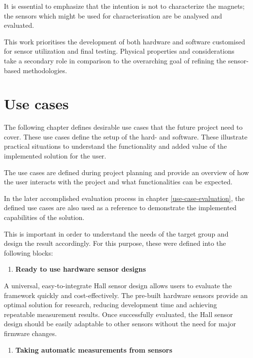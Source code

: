 It is essential to emphasize that the intention is not to characterize
the magnets; the sensors which might be used for characterisation are be
analysed and evaluated.

This work prioritises the development of both hardware and software
customised for sensor utilization and final testing. Physical properties
and considerations take a secondary role in comparison to the
overarching goal of refining the sensor-based methodologies.

\hypertarget{use-cases}{%
\section{Use cases}\label{use-cases}}

The following chapter defines desirable use cases that the future
project need to cover. These use cases define the setup of the hard- and
software. These illustrate practical situations to understand the
functionality and added value of the implemented solution for the user.

The use cases are defined during project planning and provide an
overview of how the user interacts with the project and what
functionalities can be expected.

In the later accomplished evaluation process in chapter
\ref{use-case-evaluation}, the defined use cases are also used as a
reference to demonstrate the implemented capabilities of the solution.

This is important in order to understand the needs of the target group
and design the result accordingly. For this purpose, these were defined
into the following blocks:

\begin{enumerate}
\def\labelenumi{\arabic{enumi}.}
\tightlist
\item
  \textbf{Ready to use hardware sensor designs}
\end{enumerate}

A universal, easy-to-integrate Hall sensor design allows users to
evaluate the framework quickly and cost-effectively. The pre-built
hardware sensors provide an optimal solution for research, reducing
development time and achieving repeatable measurement results. Once
successfully evaluated, the Hall sensor design should be easily
adaptable to other sensors without the need for major firmware changes.

\begin{enumerate}
\def\labelenumi{\arabic{enumi}.}
\setcounter{enumi}{1}
\tightlist
\item
  \textbf{Taking automatic measurements from sensors}
\end{enumerate}

